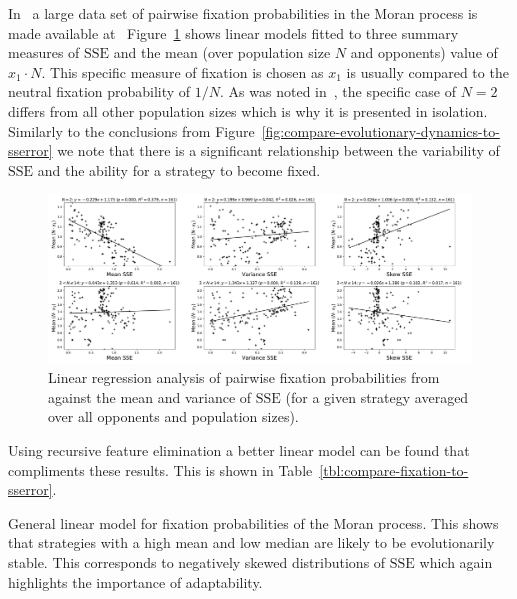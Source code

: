 \documentclass[a4paper]{article}
\newcommand{\SSe}{\text{SSE}}
\begin{document}
In~\cite{Moran1707} a large data set of pairwise fixation probabilities in the
Moran process is made available at~\cite{vincent_knight_2017_1040129}
Figure~\ref{fig:compare-fixation-to-sserror} shows linear models fitted to three
summary measures of \(\SSe\) and the mean (over population size \(N\) and
opponents) value of \(x_1\cdot N\). This specific measure of fixation is chosen
as \(x_1\) is usually compared to the neutral fixation probability of \(1 / N\).
As was noted in~\cite{Moran1707}, the specific case of \(N=2\) differs from all
other population sizes which is why it is presented in isolation. Similarly to
the conclusions from Figure~\ref{fig:compare-evolutionary-dynamics-to-sserror}
we note that there is a significant relationship between the variability of
\(\SSe\) and the ability for a strategy to become fixed.

\begin{figure}[!hbtp]
    \centering
    \includegraphics[width=\textwidth]{./assets/img/compare-fixation-to-sserror/main.pdf}
    \caption{Linear regression analysis of pairwise fixation probabilities
    from~\cite{Moran1707} against the mean and variance of
    \(\SSe\) (for a given strategy averaged over all opponents and population
    sizes).}
    \label{fig:compare-fixation-to-sserror}
\end{figure}

Using recursive feature elimination a better linear model can be found that
compliments these results. This is shown in
Table~\ref{tbl:compare-fixation-to-sserror}.

\begin{table}[!hbtp]
    \begin{center}
    \tiny
    
    \end{center}
    \caption{General linear model for fixation probabilities of the Moran
        process. This shows that strategies with a high mean
        and low median are likely to be evolutionarily stable. This corresponds
        to negatively skewed distributions of \(\SSe\) which again highlights
        the importance of adaptability.}
    \label{tbl:compare-fixation-to-sserror}
\end{table}
\end{document}
